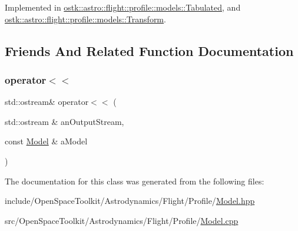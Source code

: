 Implemented in \hyperlink{classostk_1_1astro_1_1flight_1_1profile_1_1models_1_1_tabulated_a0e3d34c39a644279a9b958c3fd9bf730}{ostk\+::astro\+::flight\+::profile\+::models\+::\+Tabulated}, and \hyperlink{classostk_1_1astro_1_1flight_1_1profile_1_1models_1_1_transform_aef9a20156493d68570a989d87ac2f9f6}{ostk\+::astro\+::flight\+::profile\+::models\+::\+Transform}.



\subsection{Friends And Related Function Documentation}
\mbox{\label{classostk_1_1astro_1_1flight_1_1profile_1_1_model_a68240493d08f91f6613186eb52823e85}} 
\subsubsection{\texorpdfstring{operator$<$$<$}{operator<<}}
{\footnotesize\ttfamily std\+::ostream\& operator$<$$<$ (\begin{DoxyParamCaption}\item[{std\+::ostream \&}]{an\+Output\+Stream,  }\item[{const \hyperlink{classostk_1_1astro_1_1flight_1_1profile_1_1_model}{Model} \&}]{a\+Model }\end{DoxyParamCaption})\hspace{0.3cm}{\ttfamily [friend]}}



The documentation for this class was generated from the following files\+:\begin{DoxyCompactItemize}
\item 
include/\+Open\+Space\+Toolkit/\+Astrodynamics/\+Flight/\+Profile/\hyperlink{_flight_2_profile_2_model_8hpp}{Model.\+hpp}\item 
src/\+Open\+Space\+Toolkit/\+Astrodynamics/\+Flight/\+Profile/\hyperlink{_flight_2_profile_2_model_8cpp}{Model.\+cpp}\end{DoxyCompactItemize}
